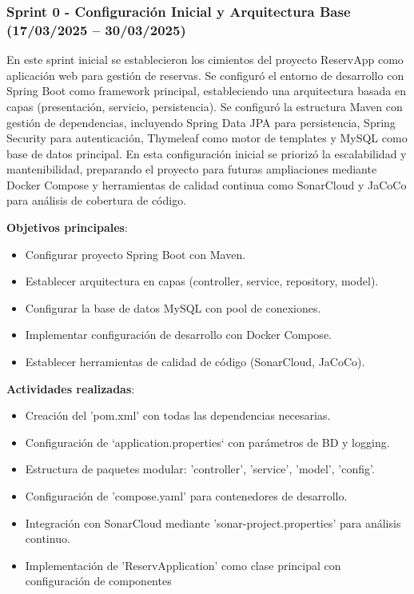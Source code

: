 \subsubsection{Sprint 0 - Configuración Inicial y Arquitectura Base (17/03/2025 – 30/03/2025)} 
En este sprint inicial se establecieron los cimientos del proyecto ReservApp como aplicación web para gestión de reservas. Se configuró el entorno de desarrollo con Spring Boot como framework principal, estableciendo una arquitectura basada en capas (presentación, servicio, persistencia). Se configuró la estructura Maven con gestión de dependencias, incluyendo Spring Data JPA para persistencia, Spring Security para autenticación, Thymeleaf como motor de templates y MySQL como base de datos principal. En esta configuración inicial se priorizó la escalabilidad y mantenibilidad, preparando el proyecto para futuras ampliaciones mediante Docker Compose y herramientas de calidad continua como SonarCloud y JaCoCo para análisis de cobertura de código.

\textbf{Objetivos principales}:
\begin{itemize}
\tightlist
\item
Configurar proyecto Spring Boot con Maven.
\item
Establecer arquitectura en capas (controller, service, repository, model).
\item
Configurar la base de datos MySQL con pool de conexiones.
\item
Implementar configuración de desarrollo con Docker Compose.
\item
Establecer herramientas de calidad de código (SonarCloud, JaCoCo).
\end{itemize}

\textbf{Actividades realizadas}:
\begin{itemize}
\tightlist
\item
Creación del 'pom.xml' con todas las dependencias necesarias.
\item
Configuración de `application.properties` con parámetros de BD y logging.
\item
Estructura de paquetes modular: 'controller', 'service', 'model', 'config'.
\item
Configuración de 'compose.yaml' para contenedores de desarrollo.
\item
Integración con SonarCloud mediante 'sonar-project.properties' para análisis continuo.
\item
Implementación de 'ReservApplication' como clase principal con configuración de componentes
\end{itemize}


